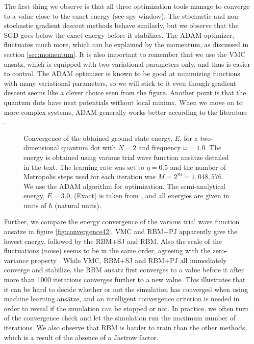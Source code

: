 The first thing we observe is that all three optimization tools manage to converge to a value close to the exact energy (see spy window). The stochastic and non-stochastic gradient descent methods behave similarly, but we observe that the SGD goes below the exact energy before it stabilizes. The ADAM optimizer, fluctuates much more, which can be explained by the momentum, as discussed in section \ref{sec:momentum}. It is also important to remember that we use the VMC ansatz, which is equipped with two variational parameters only, and thus is easier to control. The ADAM optimizer is known to be good at minimizing functions with many variational parameters, so we will stick to it even though gradient descent seems like a clever choice seen from the figure. Another point is that the quantum dots have neat potentials without local minima. When we move on to more complex systems, ADAM generally works better according to the literature \supercite{kingma_adam:_2014}.

\begin{figure}
	\centering 
	\subfloat{{}}
	\caption{Convergence of the obtained ground state energy, $E$, for a two-dimensional quantum dot with $N=2$ and frequency $\omega=1.0$. The energy is obtained using various trial wave function ansätze detailed in the text. The learning rate was set to $\eta=0.5$ and the number of Metropolis steps used for each iteration was $M=2^{20}=1,048,576$. We use the ADAM algorithm for optimization. The semi-analytical energy, $E=3.0$, (Exact) is taken from \citet{taut_two_1993}, and all energies are given in units of $\hbar$ (natural units).}
	\label{fig:convergence42}
\end{figure} 

Further, we compare the energy convergence of the various trial wave function ansätze in figure \eqref{fig:convergence42}. VMC and RBM+PJ apparently give the lowest energy, followed by the RBM+SJ and RBM. Also the scale of the fluctuations (noise) seems to be in the same order, agreeing with the zero-variance property \supercite{assaraf_zero-variance_2003}. While VMC, RBM+SJ and RBM+PJ all immediately converge and stabilize, the RBM ansatz first converges to a value before it after more than 1000 iterations converges further to a new value. This illustrates that it can be hard to decide whether or not the simulation has converged when using machine learning ansätze, and an intelligent convergence criterion is needed in order to reveal if the simulation can be stopped or not. In practice, we often turn of the convergence check and let the simulation run the maximum number of iterations. We also observe that RBM is harder to train than the other methods, which is a result of the absence of a Jastrow factor.

